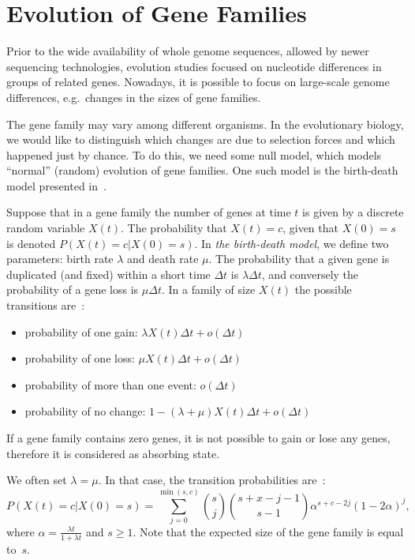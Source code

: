 \section{Evolution of Gene Families}

Prior to the wide availability of whole genome sequences, allowed by newer sequencing technologies, evolution studies focused on nucleotide differences in groups of related genes. Nowadays, it is possible to focus on large-scale genome differences, e.g.\ changes in the sizes of gene families.

The gene family may vary among different organisms. In the evolutionary biology, we would like to distinguish which changes are due to selection forces and which happened just by chance. To do this, we need some null model, which models ``normal'' (random) evolution of gene families. One such model is the birth-death  model presented in~\cite{hahn2005estimating}.

Suppose that in a gene family the number of genes at time $t$ is given by a discrete random variable $X(t)$. The probability that $X(t) = c$, given that $X(0) = s$ is denoted $P(X(t) = c | X(0) = s)$.
In \emph{the birth-death model}, we define two parameters: birth rate $\lambda$ and death rate $\mu$. The probability that a given gene is duplicated (and fixed) within a short time $\Delta t$ is $\lambda \Delta t$, and conversely the probability of a gene loss is $\mu \Delta t$. In a family of size $X(t)$ the possible transitions are~\cite{hahn2005estimating}:
\begin{itemize}
  \item probability of one gain: $\lambda X(t) \Delta t + o(\Delta t)$
  \item probability of one loss: $\mu X(t) \Delta t + o(\Delta t)$
  \item probability of more than one event: $o(\Delta t)$
  \item probability of no change: $1 - (\lambda + \mu) X(t) \Delta t + o(\Delta t)$
\end{itemize}
If a gene family contains zero genes, it is not possible to gain or lose any genes, therefore it is considered as absorbing state.

We often set $\lambda = \mu$. In that case, the transition probabilities are~\cite{hahn2005estimating}:
$$P(X(t) = c | X(0) = s) = \sum_{j=0}^{\min(s, c)} {s \choose j}{s+x-j-1 \choose s-1}\alpha^{s+c-2j}{(1-2\alpha)}^j,$$
where $\alpha = \frac{\lambda t}{1+ \lambda t}$ and $s \geq 1$. Note that the expected size of the gene family is equal to~$s$.

